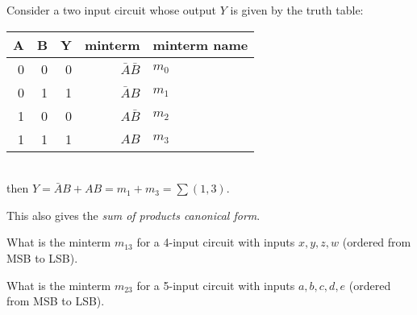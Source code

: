 \noindent Consider a two input circuit whose output $Y$ is given by the truth table:\\
\begin{tabular}{rrrrp{20mm}}
  \toprule
  A & B &  Y & minterm & minterm name\\
  \midrule
  0 & 0 & 0 & $\bar{A} \bar{B}$ & $m_0$ \\
  0 & 1 & 1 & $\bar{A}      B $ & $m_1$ \\
  1 & 0 & 0 & $     A  \bar{B}$ & $m_2$ \\
  1 & 1 & 1 & $     A       B $ & $m_3$ \\
  \bottomrule
\end{tabular}\\[1em]
then $Y = \bar{A}      B  + A B = m_1 + m_3 = \sum (1, 3)$.

\noindent This also gives the \emph{sum of products canonical form}.

\begin{example}
  What is the minterm $m_{13}$ for a 4-input circuit with inputs $x, y, z, w$
  (ordered from MSB to LSB).
\end{example}
\vspace{10em}


\begin{prob}
  What is the minterm $m_{23}$ for a 5-input circuit with inputs $a, b, c, d, e$
  (ordered from MSB to LSB).
\end{prob}
\vspace{10em}

